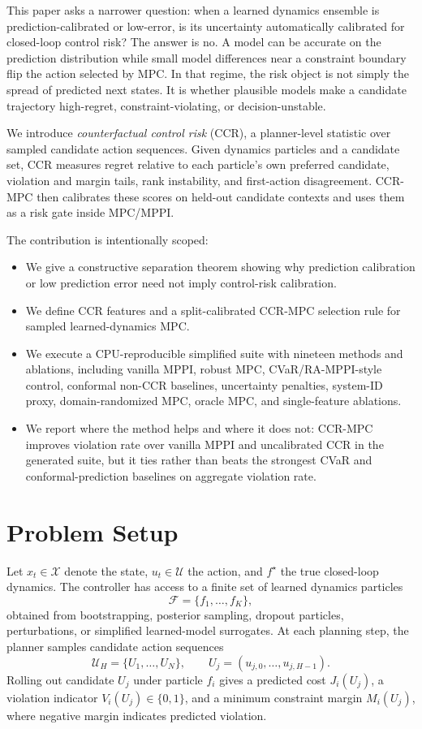 \documentclass[11pt]{article}
\begin{document}
This paper asks a narrower question: when a learned dynamics ensemble is prediction-calibrated or low-error, is its uncertainty automatically calibrated for closed-loop control risk? The answer is no. A model can be accurate on the prediction distribution while small model differences near a constraint boundary flip the action selected by MPC. In that regime, the risk object is not simply the spread of predicted next states. It is whether plausible models make a candidate trajectory high-regret, constraint-violating, or decision-unstable.

We introduce \emph{counterfactual control risk} (CCR), a planner-level statistic over sampled candidate action sequences. Given dynamics particles and a candidate set, CCR measures regret relative to each particle's own preferred candidate, violation and margin tails, rank instability, and first-action disagreement. CCR-MPC then calibrates these scores on held-out candidate contexts and uses them as a risk gate inside MPC/MPPI.

The contribution is intentionally scoped:
\begin{itemize}
  \item We give a constructive separation theorem showing why prediction calibration or low prediction error need not imply control-risk calibration.
  \item We define CCR features and a split-calibrated CCR-MPC selection rule for sampled learned-dynamics MPC.
  \item We execute a CPU-reproducible simplified suite with nineteen methods and ablations, including vanilla MPPI, robust MPC, CVaR/RA-MPPI-style control, conformal non-CCR baselines, uncertainty penalties, system-ID proxy, domain-randomized MPC, oracle MPC, and single-feature ablations.
  \item We report where the method helps and where it does not: CCR-MPC improves violation rate over vanilla MPPI and uncalibrated CCR in the generated suite, but it ties rather than beats the strongest CVaR and conformal-prediction baselines on aggregate violation rate.
\end{itemize}

\section{Problem Setup}

Let $x_t \in \mathcal{X}$ denote the state, $u_t \in \mathcal{U}$ the action, and $f^\star$ the true closed-loop dynamics. The controller has access to a finite set of learned dynamics particles
\[
  \mathcal{F} = \{f_1,\ldots,f_K\},
\]
obtained from bootstrapping, posterior sampling, dropout particles, perturbations, or simplified learned-model surrogates. At each planning step, the planner samples candidate action sequences
\[
  \mathcal{U}_H = \{U_1,\ldots,U_N\}, \qquad U_j=(u_{j,0},\ldots,u_{j,H-1}).
\]
Rolling out candidate $U_j$ under particle $f_i$ gives a predicted cost $J_i(U_j)$, a violation indicator $V_i(U_j)\in\{0,1\}$, and a minimum constraint margin $M_i(U_j)$, where negative margin indicates predicted violation.
\end{document}
